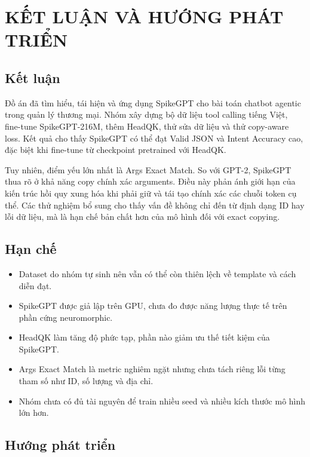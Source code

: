 \documentclass[12pt,a4paper,oneside]{report}
\newlength{\manualparindent}
\newcommand{\manualindent}{\hspace*{\manualparindent}}
\begin{document}
\chapter{KẾT LUẬN VÀ HƯỚNG PHÁT TRIỂN}

\section{Kết luận}

\manualindent%
Đồ án đã tìm hiểu, tái hiện và ứng dụng SpikeGPT cho bài toán chatbot agentic trong quản lý thương mại. Nhóm xây dựng bộ dữ liệu tool calling tiếng Việt, fine-tune SpikeGPT-216M, thêm HeadQK, thử sửa dữ liệu và thử copy-aware loss. Kết quả cho thấy SpikeGPT có thể đạt Valid JSON và Intent Accuracy cao, đặc biệt khi fine-tune từ checkpoint pretrained với HeadQK.

\manualindent%
Tuy nhiên, điểm yếu lớn nhất là Args Exact Match. So với GPT-2, SpikeGPT thua rõ ở khả năng copy chính xác arguments. Điều này phản ánh giới hạn của kiến trúc hồi quy xung hóa khi phải giữ và tái tạo chính xác các chuỗi token cụ thể. Các thử nghiệm bổ sung cho thấy vấn đề không chỉ đến từ định dạng ID hay lỗi dữ liệu, mà là hạn chế bản chất hơn của mô hình đối với exact copying.

\section{Hạn chế}

\begin{itemize}
  \item Dataset do nhóm tự sinh nên vẫn có thể còn thiên lệch về template và cách diễn đạt.
  \item SpikeGPT được giả lập trên GPU, chưa đo được năng lượng thực tế trên phần cứng neuromorphic.
  \item HeadQK làm tăng độ phức tạp, phần nào giảm ưu thế tiết kiệm của SpikeGPT.
  \item Args Exact Match là metric nghiêm ngặt nhưng chưa tách riêng lỗi từng tham số như ID, số lượng và địa chỉ.
  \item Nhóm chưa có đủ tài nguyên để train nhiều seed và nhiều kích thước mô hình lớn hơn.
\end{itemize}

\section{Hướng phát triển}
\end{document}
